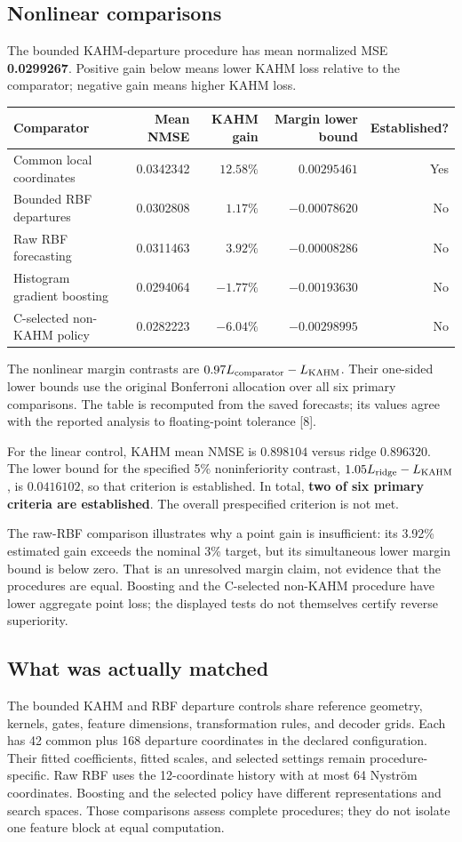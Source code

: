 \documentclass[11pt]{article}
\begin{document}
\subsection*{Nonlinear comparisons}
The bounded KAHM-departure procedure has mean normalized MSE
\textbf{0.0299267}. Positive gain below means lower KAHM loss relative to
the comparator; negative gain means higher KAHM loss.

\begin{center}
\small
\begin{tabularx}{\linewidth}{@{}Yrrrr@{}}
\toprule
Comparator & Mean NMSE & KAHM gain & Margin lower bound & Established? \\
\midrule
Common local coordinates & 0.0342342 & $12.58\%$ & $0.00295461$ & Yes \\
Bounded RBF departures & 0.0302808 & $1.17\%$ & $-0.00078620$ & No \\
Raw RBF forecasting & 0.0311463 & $3.92\%$ & $-0.00008286$ & No \\
Histogram gradient boosting & 0.0294064 & $-1.77\%$ & $-0.00193630$ & No \\
C-selected non-KAHM policy & 0.0282223 & $-6.04\%$ & $-0.00298995$ & No \\
\bottomrule
\end{tabularx}
\end{center}
The nonlinear margin contrasts are $0.97L_{\rm comparator}-L_{\rm KAHM}$.
Their one-sided lower bounds use the original Bonferroni allocation over
all six primary comparisons. The table is recomputed from the saved
forecasts; its values agree with the reported analysis to floating-point
tolerance [8].

For the linear control, KAHM mean NMSE is $0.898104$ versus ridge
$0.896320$. The lower bound for the specified 5\% noninferiority contrast,
$1.05L_{\rm ridge}-L_{\rm KAHM}$, is $0.0416102$, so that criterion is
established. In total, \textbf{two of six primary criteria are established}.
The overall prespecified criterion is not met.

The raw-RBF comparison illustrates why a point gain is insufficient: its
3.92\% estimated gain exceeds the nominal 3\% target, but its
simultaneous lower margin bound is below zero. That is an unresolved
margin claim, not evidence that the procedures are equal. Boosting and
the C-selected non-KAHM procedure have lower aggregate point loss;
the displayed tests do not themselves certify reverse superiority.

\subsection*{What was actually matched}
The bounded KAHM and RBF departure controls share reference geometry,
kernels, gates, feature dimensions, transformation rules, and decoder
grids. Each has 42 common plus 168 departure coordinates in the declared
configuration. Their fitted coefficients, fitted scales, and selected
settings remain procedure-specific. Raw RBF uses the 12-coordinate
history with at most 64 Nystr\"om coordinates. Boosting and the selected
policy have different representations and search spaces. Those
comparisons assess complete procedures; they do not isolate one
feature block at equal computation.
\end{document}

